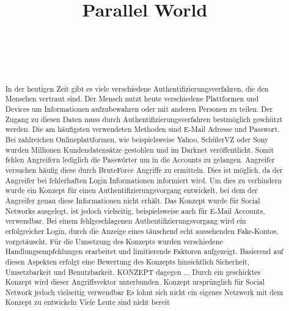 \documentclass{sigchi}
\def\plaintitle{Parallel World}
\begin{document}
\title{\plaintitle}

\author{%
  \\
  \\
  \\
}

\maketitle

\begin{abstract}
In der heutigen Zeit gibt es viele verschiedene Authentifizierungsverfahren, die den Menschen vertraut sind. Der Mensch nutzt heute verschiedene Plattformen und Devices um Informationen aufzubewahren oder mit anderen Personen zu teilen. Der Zugang zu diesen Daten muss durch Authentifizierungsverfahren bestmöglich geschützt werden. Die am häufigsten verwendeten Methoden sind E-Mail Adresse und Passwort. Bei zahlreichen Onlineplattformen, wie beispielsweise Yahoo, SchülerVZ oder Sony wurden Millionen Kundendatensätze gestohlen und im Darknet veröffentlicht. Somit fehlen Angreifern lediglich die Passwörter um in die Accounts zu gelangen. Angreifer versuchen häufig diese durch BruteForce Angriffe zu ermitteln. Dies ist möglich, da der Angreifer bei fehlerhaften Login Informationen informiert wird. Um dies zu verhindern wurde ein Konzept für einen Authentifizierungsvorgang entwickelt, bei dem der Angreifer genau diese Informationen nicht erhält. Das Konzept wurde für Social Networks ausgelegt, ist jedoch vielseitig, beispielsweise auch für E-Mail Accounts, verwendbar. Bei einem fehlgeschlagenen Authentifizierungsvorgang wird ein erfolgreicher Login, durch die Anzeige eines täuschend echt aussehenden Fake-Kontos, vorgetäuscht. Für die Umsetzung des Konzepts wurden verschiedene Handlungsempfehlungen erarbeitet und limitierende Faktoren aufgezeigt. Basierend auf diesen Aspekten erfolgt eine Bewertung des Konzepts hinsichtlich Sicherheit, Umsetzbarkeit und Benutzbarkeit. 
  KONZEPT dagegen ...   Durch ein geschicktes Konzept wird dieser Angriffsvektor unterbunden. Konzept ursprünglich für Social Network jedoch vielseitig verwendbar
Es lohnt sich nicht ein eigenes Netzwerk mit dem Konzept zu entwickeln
Viele Leute sind nicht bereit
\end{abstract}
\end{document}
